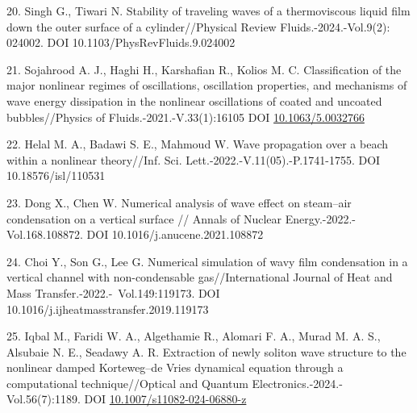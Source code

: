\begin{references}
20. Singh G., Tiwari N. Stability of traveling waves of a thermoviscous
liquid film down the outer surface of a cylinder//Physical Review
Fluids.-2024.-Vol.9(2): 024002.
DOI 10.1103/PhysRevFluids.9.024002

21. Sojahrood A. J., Haghi H., Karshafian R., Kolios M. C. Classification
of the major nonlinear regimes of oscillations, oscillation properties,
and mechanisms of wave energy dissipation in the nonlinear oscillations
of coated and uncoated bubbles//Physics of Fluids.-2021.-V.33(1):16105
DOI \href{http://dx.doi.org/10.1063/5.0032766}{10.1063/5.0032766}

22. Helal M. A., Badawi S. E., Mahmoud W. Wave propagation over a beach
within a nonlinear theory//Inf. Sci. Lett.-2022.-V.11(05).-P.1741-1755.
DOI 10.18576/isl/110531

23. Dong X., Chen W. Numerical analysis of wave effect on steam--air
condensation on a vertical surface // Annals of Nuclear
Energy.-2022.-Vol.168.108872.
DOI 10.1016/j.anucene.2021.108872

24. Choi Y., Son G., Lee G. Numerical simulation of wavy film
condensation in a vertical channel with non-condensable
gas//International Journal of Heat and Mass
Transfer.-2022.-~Vol.149:119173. DOI\\
10.1016/j.ijheatmasstransfer.2019.119173

25. Iqbal M., Faridi W. A., Algethamie R., Alomari F. A., Murad M. A. S.,
Alsubaie N. E., Seadawy A. R. Extraction of newly soliton wave structure
to the nonlinear damped Korteweg--de Vries dynamical equation through a
computational technique//Optical and Quantum
Electronics.-2024.-Vol.56(7):1189. DOI
\href{https://ui.adsabs.harvard.edu/link_gateway/2024OQEle..56.1189I/doi:10.1007/s11082-024-06880-z}{10.1007/s11082-024-06880-z}~
\end{references}

